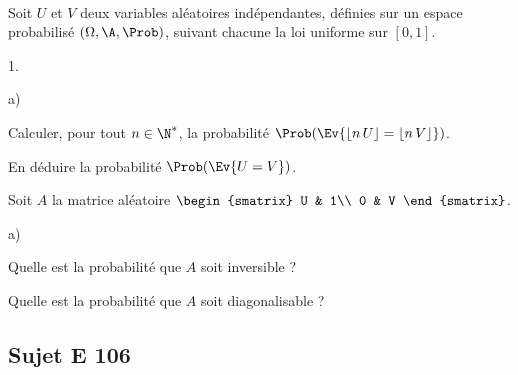 \documentclass[11pt]{article}%
\begin{document}
\begin{exerciceSP}~\\
  Soit $U$ et $V$ deux variables aléatoires indépendantes, définies 
  sur un espace probabilisé $(\Omega, \A, \Prob)$, suivant chacune 
  la loi uniforme sur $[0,1]$.
  \begin{noliste}{1.}
    \setlength{\itemsep}{2mm}
    \item 
    \begin{noliste}{a)}
    \setlength{\itemsep}{2mm}
      \item Calculer, pour tout $n\in \N^*$, la probabilité 
      $\Prob(\Ev{\lfloor n \, U \rfloor = \lfloor n \, V \rfloor})$.
      
      \item En déduire la probabilité $\Prob(\Ev{U=V})$.
    \end{noliste}
    
    \item Soit $A$ la matrice aléatoire $
    \begin{smatrix}
      U & 1\\
      0 & V
    \end{smatrix}$.
    \begin{noliste}{a)}
    \setlength{\itemsep}{2mm}
      \item Quelle est la probabilité que $A$ soit inversible ?
      
      \item Quelle est la probabilité que $A$ soit diagonalisable ?
    \end{noliste}
  \end{noliste}
\end{exerciceSP}






\subsection*{Sujet E 106}

\end{document}
